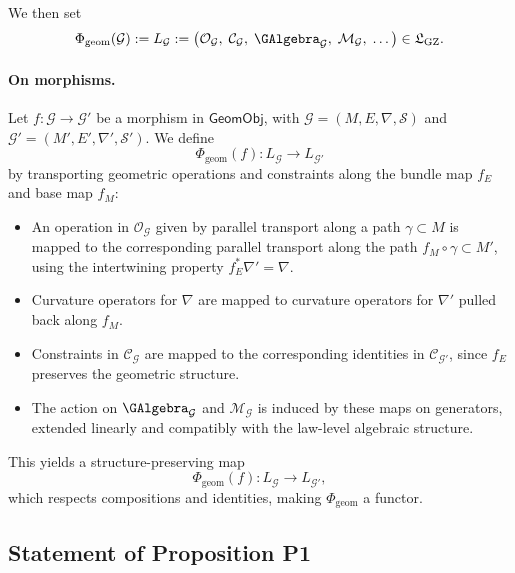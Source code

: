 \documentclass[11pt]{book}
\theoremstyle{plain}
\theoremstyle{definition}
\newcommand{\GZLS}{\ensuremath{\mathfrak{L}_{\mathrm{GZ}}}}       \newcommand{\GZLT}{\ensuremath{M_{!w}}}                           \newcommand{\GZLOC}{\ensuremath{A_M}}                             \newcommand{\GZLCurv}{\ensuremath{\mathcal{F}_{\mathrm{law}}}}
\begin{document}
We then set
\[
  \Phi_{\mathrm{geom}}(\mathcal{G})
  :=
  L_{\mathcal{G}}
  :=
  \bigl(
    \mathcal{O}_{\mathcal{G}},\;
    \mathcal{C}_{\mathcal{G}},\;
    \GAlgebra_{\mathcal{G}},\;
    \mathcal{M}_{\mathcal{G}},\;\dots
  \bigr)
  \in \GZLS.
\]



\paragraph{On morphisms.}
Let \(f:\mathcal{G}\to\mathcal{G}'\) be a morphism in
\(\mathsf{GeomObj}\), with
\(\mathcal{G}=(M,E,\nabla,\mathcal{S})\) and
\(\mathcal{G}'=(M',E',\nabla',\mathcal{S}')\).  We define
\[
  \Phi_{\mathrm{geom}}(f)
  :
  L_{\mathcal{G}}\longrightarrow L_{\mathcal{G}'}
\]
by transporting geometric operations and constraints along the
bundle map \(f_E\) and base map \(f_M\):

\begin{itemize}
  \item An operation in \(\mathcal{O}_{\mathcal{G}}\) given by parallel
        transport along a path \(\gamma\subset M\) is mapped to the
        corresponding parallel transport along the path
        \(f_M\circ\gamma\subset M'\), using the intertwining property
        \(f_E^*\nabla'=\nabla\).
  \item Curvature operators for \(\nabla\) are mapped to curvature
        operators for \(\nabla'\) pulled back along \(f_M\).
  \item Constraints in \(\mathcal{C}_{\mathcal{G}}\) are mapped to the
        corresponding identities in \(\mathcal{C}_{\mathcal{G}'}\),
        since \(f_E\) preserves the geometric structure.
  \item The action on \(\GAlgebra_{\mathcal{G}}\) and
        \(\mathcal{M}_{\mathcal{G}}\) is induced by these maps on
        generators, extended linearly and compatibly with the law-level
        algebraic structure.
\end{itemize}

This yields a structure-preserving map
\[
  \Phi_{\mathrm{geom}}(f):L_{\mathcal{G}}\to L_{\mathcal{G}'},
\]
which respects compositions and identities, making
\(\Phi_{\mathrm{geom}}\) a functor.



\subsection*{Statement of Proposition P1}
\end{document}
